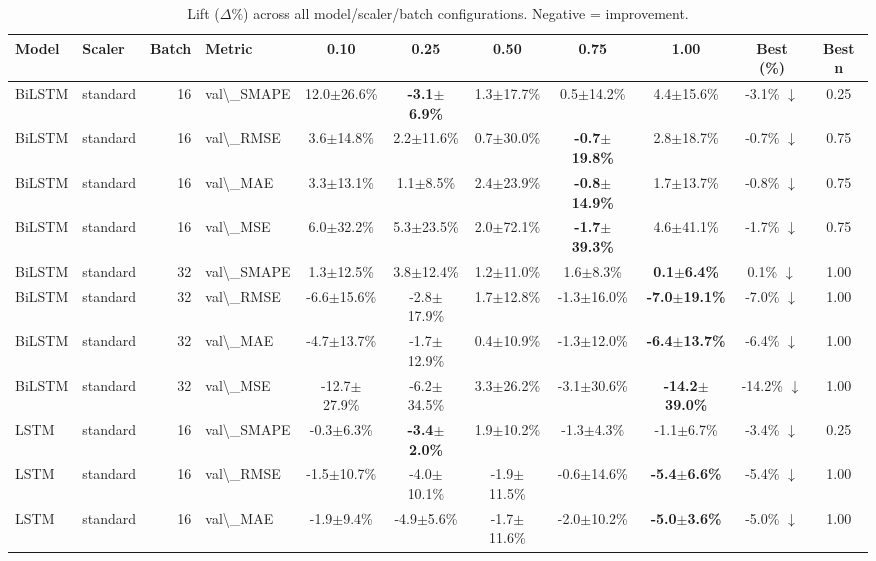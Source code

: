\begin{table}[t]
\centering
\caption{Lift ($\Delta\%$) across all model/scaler/batch configurations. Negative = improvement.}
\label{tab:lift}
\begin{tabular}{l l r l c c c c c c c}
\toprule
Model & Scaler & Batch & Metric & 0.10 & 0.25 & 0.50 & 0.75 & 1.00 & Best (\%) & Best n \\
\midrule
BiLSTM & standard & 16 & val\textbackslash{}_SMAPE & 12.0$\pm$26.6\% & \textbf{-3.1$\pm$6.9\%} & 1.3$\pm$17.7\% & 0.5$\pm$14.2\% & 4.4$\pm$15.6\% & -3.1\% $\downarrow$ & 0.25 \\
BiLSTM & standard & 16 & val\textbackslash{}_RMSE & 3.6$\pm$14.8\% & 2.2$\pm$11.6\% & 0.7$\pm$30.0\% & \textbf{-0.7$\pm$19.8\%} & 2.8$\pm$18.7\% & -0.7\% $\downarrow$ & 0.75 \\
BiLSTM & standard & 16 & val\textbackslash{}_MAE & 3.3$\pm$13.1\% & 1.1$\pm$8.5\% & 2.4$\pm$23.9\% & \textbf{-0.8$\pm$14.9\%} & 1.7$\pm$13.7\% & -0.8\% $\downarrow$ & 0.75 \\
BiLSTM & standard & 16 & val\textbackslash{}_MSE & 6.0$\pm$32.2\% & 5.3$\pm$23.5\% & 2.0$\pm$72.1\% & \textbf{-1.7$\pm$39.3\%} & 4.6$\pm$41.1\% & -1.7\% $\downarrow$ & 0.75 \\
BiLSTM & standard & 32 & val\textbackslash{}_SMAPE & 1.3$\pm$12.5\% & 3.8$\pm$12.4\% & 1.2$\pm$11.0\% & 1.6$\pm$8.3\% & \textbf{0.1$\pm$6.4\%} & 0.1\% $\downarrow$ & 1.00 \\
BiLSTM & standard & 32 & val\textbackslash{}_RMSE & -6.6$\pm$15.6\% & -2.8$\pm$17.9\% & 1.7$\pm$12.8\% & -1.3$\pm$16.0\% & \textbf{-7.0$\pm$19.1\%} & -7.0\% $\downarrow$ & 1.00 \\
BiLSTM & standard & 32 & val\textbackslash{}_MAE & -4.7$\pm$13.7\% & -1.7$\pm$12.9\% & 0.4$\pm$10.9\% & -1.3$\pm$12.0\% & \textbf{-6.4$\pm$13.7\%} & -6.4\% $\downarrow$ & 1.00 \\
BiLSTM & standard & 32 & val\textbackslash{}_MSE & -12.7$\pm$27.9\% & -6.2$\pm$34.5\% & 3.3$\pm$26.2\% & -3.1$\pm$30.6\% & \textbf{-14.2$\pm$39.0\%} & -14.2\% $\downarrow$ & 1.00 \\
LSTM & standard & 16 & val\textbackslash{}_SMAPE & -0.3$\pm$6.3\% & \textbf{-3.4$\pm$2.0\%} & 1.9$\pm$10.2\% & -1.3$\pm$4.3\% & -1.1$\pm$6.7\% & -3.4\% $\downarrow$ & 0.25 \\
LSTM & standard & 16 & val\textbackslash{}_RMSE & -1.5$\pm$10.7\% & -4.0$\pm$10.1\% & -1.9$\pm$11.5\% & -0.6$\pm$14.6\% & \textbf{-5.4$\pm$6.6\%} & -5.4\% $\downarrow$ & 1.00 \\
LSTM & standard & 16 & val\textbackslash{}_MAE & -1.9$\pm$9.4\% & -4.9$\pm$5.6\% & -1.7$\pm$11.6\% & -2.0$\pm$10.2\% & \textbf{-5.0$\pm$3.6\%} & -5.0\% $\downarrow$ & 1.00 \\

\end{tabular}
\end{table}
